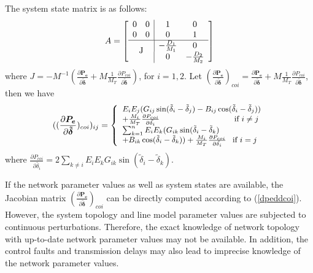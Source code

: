 \documentclass[journal]{IEEEtran}
\begin{document}
The system state matrix is as follows:
\begin{equation}
A=\left[\begin{array}{cc|cc}0&0&1&0\\0&0&0&1\\\hline\multicolumn{2}{c}{\multirow{2}{*}{J}}\vline\hspace{-0.002in}&-\frac{D_1}{M_1}&0\\&&0&-\frac{D_2}{M_2}\end{array}\right]\label{A}
\end{equation}
where $J=-M^{-1}(\frac{\partial\bm{P_e}}{\partial\bm{\tilde{\delta}}}+M\frac{1}{M_T}\frac{\partial P_{coi}}{\partial\bm{\tilde{\delta}}})$, for $i=1,2$. Let $(\frac{\partial\bm{P_e}}{\partial\bm{\tilde{\delta}}})_{coi}=\frac{\partial\bm{P_e}}{\partial\bm{\tilde{\delta}}}+M\frac{1}{M_T}\frac{\partial P_{coi}}{\partial\bm{\tilde{\delta}}}$, then we have
\begin{equation}
\small{((\frac{\partial\bm{P_e}}{\partial\bm{\tilde{\delta}}})_{coi})_{ij}}=\left\{\begin{array}{l}E_iE_j(G_{ij}\sin(\tilde{\delta}_i-\tilde{\delta}_j)-B_{ij}\cos(\tilde{\delta}_i-\tilde{\delta}_j))\\
+\frac{M_i}{M_T}\frac{\partial P_{coi}}{\partial\tilde{\delta_i}} \hspace{1.2in} \mbox{if $i\not=j$}\\
\sum^{n}_{k=1}E_iE_k(G_{ik}\sin(\tilde{\delta}_i-\tilde{\delta}_k)\\
+B_{ik}\cos(\tilde{\delta}_i-\tilde{\delta}_k))+\frac{M_i}{M_T}\frac{\partial P_{coi}}{\partial\tilde{\delta_i}} \hspace{0.1in} \mbox{if $i=j$}
\end{array}\right.\label{dpeddcoi}
\end{equation}
where $\frac{\partial P_{coi}}{\partial \tilde{\delta_i}}=2\sum_{k\not=i}E_iE_kG_{ik}\sin(\tilde{\delta}_i-\tilde{\delta}_k)$.

If the network parameter values as well as system states are available, the Jacobian matrix $(\frac{\partial\bm{P_e}}{\partial\bm{\tilde{\delta}}})_{coi}$ can be directly computed according to (\ref{dpeddcoi}). However, the system topology and line model parameter values are subjected to continuous perturbations. Therefore, the exact knowledge of network topology with up-to-date network parameter values may not be available. In addition, the control faults and transmission delays may also lead to imprecise knowledge of the network parameter values.
\end{document}

